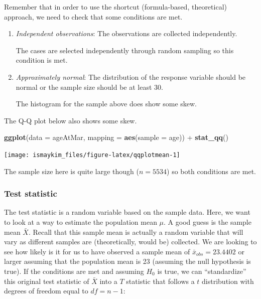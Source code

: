 \documentclass[]{tufte-book}
\newenvironment{Shaded}{\begin{snugshade}}{\end{snugshade}}
\newcommand{\KeywordTok}[1]{\textcolor[rgb]{0.13,0.29,0.53}{\textbf{{#1}}}}
\newcommand{\DataTypeTok}[1]{\textcolor[rgb]{0.13,0.29,0.53}{{#1}}}
\newcommand{\StringTok}[1]{\textcolor[rgb]{0.31,0.60,0.02}{{#1}}}
\newcommand{\NormalTok}[1]{{#1}}
\begin{document}
Remember that in order to use the shortcut (formula-based, theoretical)
approach, we need to check that some conditions are met.

\begin{enumerate}
\def\labelenumi{\arabic{enumi}.}
\item
  \emph{Independent observations}: The observations are collected
  independently.

  The cases are selected independently through random sampling so this
  condition is met.
\item
  \emph{Approximately normal}: The distribution of the response variable
  should be normal or the sample size should be at least 30.

  The histogram for the sample above does show some skew.
\end{enumerate}

The Q-Q plot below also shows some skew.

\begin{Shaded}
\begin{Highlighting}[]
\KeywordTok{ggplot}\NormalTok{(}\DataTypeTok{data =} \NormalTok{ageAtMar, }\DataTypeTok{mapping =} \KeywordTok{aes}\NormalTok{(}\DataTypeTok{sample =} \NormalTok{age)) +}
\StringTok{  }\KeywordTok{stat_qq}\NormalTok{()}
\end{Highlighting}
\end{Shaded}

\begin{center}\texttt{[image: ismaykim\_files/figure-latex/qqplotmean-1]} \end{center}

The sample size here is quite large though (\(n = 5534\)) so both
conditions are met.

\subsubsection{Test statistic}\label{test-statistic}

The test statistic is a random variable based on the sample data. Here,
we want to look at a way to estimate the population mean \(\mu\). A good
guess is the sample mean \(\bar{X}\). Recall that this sample mean is
actually a random variable that will vary as different samples are
(theoretically, would be) collected. We are looking to see how likely is
it for us to have observed a sample mean of \(\bar{x}_{obs} = 23.4402\)
or larger assuming that the population mean is 23 (assuming the null
hypothesis is true). If the conditions are met and assuming \(H_0\) is
true, we can ``standardize'' this original test statistic of \(\bar{X}\)
into a \(T\) statistic that follows a \(t\) distribution with degrees of
freedom equal to \(df = n - 1\):
\end{document}
